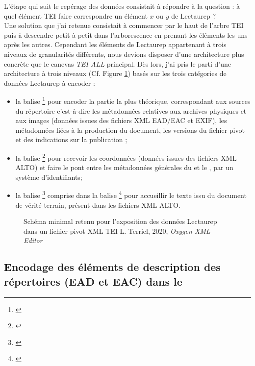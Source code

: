 L'étape qui suit le repérage des données consistait à répondre à la question : à quel élément TEI faire correspondre un élément $x$ ou $y$ de Lectaurep ?\\ 

Une solution que j'ai retenue consistait à commencer par le haut de l'arbre TEI puis à descendre petit à petit dans l'arborescence en prenant les éléments les uns après les autres. Cependant les éléments de Lectaurep appartenant à trois niveaux de granularités différents, nous devions disposer d'une architecture plus concrète que le canevas \textit{TEI ALL} principal. Dès lors, j'ai pris le parti d'une  architecture à trois niveaux (Cf. Figure \ref{fig:structure_general_template_tei_lectaurep}) basés sur les trois catégories de données Lectaurep à encoder : 
\begin{itemize}
    \item la balise \footnote{\cite{tei_tei_nodate}} pour encoder la partie la plus théorique, correspondant aux sources du répertoire c'est-à-dire les métadonnées relatives aux archives physiques et aux images (données issues des fichiers XML EAD/EAC et EXIF), les métadonnées liées à la production du document, les versions du fichier pivot et des indications sur la publication ;
    \item la balise \footnote{\cite{tei_tei_nodate-2}} pour recevoir les coordonnées (données issues des fichiers XML ALTO) et faire le pont entre les métadonnées générales du  et le , par un système d'identifiants;
    \item la balise \footnote{\cite{tei_tei_nodate-3}} comprise dans la balise \footnote{\cite{tei_tei_nodate-1}} pour accueillir le texte issu du document de vérité terrain, présent dans les fichiers XML ALTO.
\end{itemize}

\begin{figure}[h]
    \centering
    \centerline{}
    \caption{Schéma minimal retenu pour l'exposition des données Lectaurep dans un fichier pivot XML-TEI \textcopyright L. Terriel, 2020, \textit{Oxygen XML Editor}}
    \label{fig:structure_general_template_tei_lectaurep}
\end{figure}
\newpage

\subsection{Encodage des éléments de description des répertoires (EAD et EAC) dans le }

